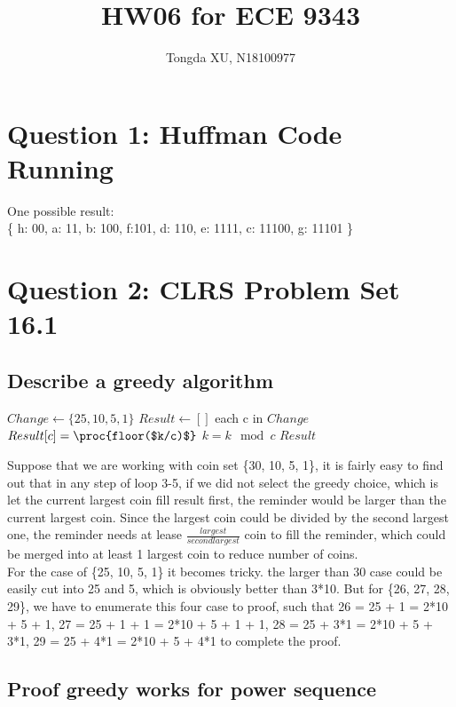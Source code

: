 \documentclass[]{article}
\title{HW06 for ECE 9343}
\author{Tongda XU, N18100977}
\begin{document}
\maketitle

\section{Question 1: Huffman Code Running}
One possible result:\\
\{ h: 00, a: 11, b: 100, f:101, d: 110, e: 1111, c: 11100, g: 11101 \} 

\section{Question 2: CLRS Problem Set 16.1}
\subsection{Describe a greedy algorithm}

\begin{codebox}
	
	\li $Change \leftarrow \{25, 10, 5, 1\}$
	\li $Result \leftarrow []$
	\li \For each c in $Change$
	\li 	\Do $Result [c] = \proc{floor($k/c)$}$
	\li     $k = k \mod c$  \End  
	\li \Return $Result$
\end{codebox}

Suppose that we are working with coin set \{30, 10, 5, 1\}, it is fairly easy to find out that in any step of loop 3-5, if we did not select the greedy choice, which is let the current largest coin fill result first, the reminder would be larger than the current largest coin. Since the largest coin could be divided by the second largest one, the reminder needs at lease $\frac{largest}{second largest}$ coin to fill the reminder, which could be merged into at least 1 largest coin to reduce number of coins.\\

For the case of \{25, 10, 5, 1\} it becomes tricky. the larger than 30 case could be easily cut into 25 and 5, which is obviously better than 3*10. But for \{26, 27, 28, 29\}, we have to enumerate this four case to proof, such that 26 = 25 + 1 = 2*10 + 5 + 1, 27 = 25 + 1 + 1 = 2*10 + 5 + 1 + 1, 28 = 25 + 3*1 = 2*10 + 5 + 3*1, 29 = 25 + 4*1 = 2*10 + 5 + 4*1 to complete the proof. 

\subsection{Proof greedy works for power sequence}
\end{document}
